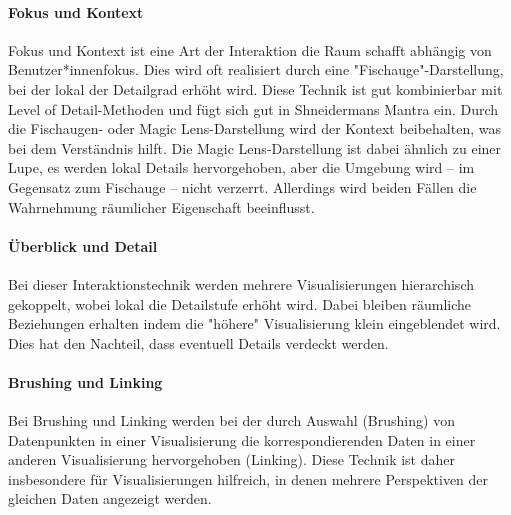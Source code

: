 				\paragraph{Fokus und Kontext}
					Fokus und Kontext ist eine Art der Interaktion die Raum schafft abhängig von Benutzer*innenfokus. Dies wird oft realisiert durch eine "Fischauge"-Darstellung, bei der lokal der Detailgrad erhöht wird. Diese Technik ist gut kombinierbar mit Level of Detail-Methoden und fügt sich gut in Shneidermans Mantra ein. Durch die Fischaugen- oder Magic Lens-Darstellung wird der Kontext beibehalten, was bei dem Verständnis hilft. Die Magic Lens-Darstellung ist dabei ähnlich zu einer Lupe, \dh es werden lokal Details hervorgehoben, aber die Umgebung wird -- im Gegensatz zum Fischauge -- nicht verzerrt. Allerdings wird beiden Fällen die Wahrnehmung räumlicher Eigenschaft beeinflusst.

				\paragraph{Überblick und Detail}
					Bei dieser Interaktionstechnik werden mehrere Visualisierungen hierarchisch gekoppelt, wobei lokal die Detailstufe erhöht wird. Dabei bleiben räumliche Beziehungen erhalten indem die "höhere" Visualisierung klein eingeblendet wird. Dies hat den Nachteil, dass eventuell Details verdeckt werden.

				\paragraph{Brushing und Linking}
					Bei Brushing und Linking werden bei der durch Auswahl (Brushing) von Datenpunkten in einer Visualisierung die korrespondierenden Daten in einer anderen Visualisierung hervorgehoben (Linking). Diese Technik ist daher insbesondere für Visualisierungen hilfreich, in denen mehrere Perspektiven der gleichen Daten angezeigt werden.

